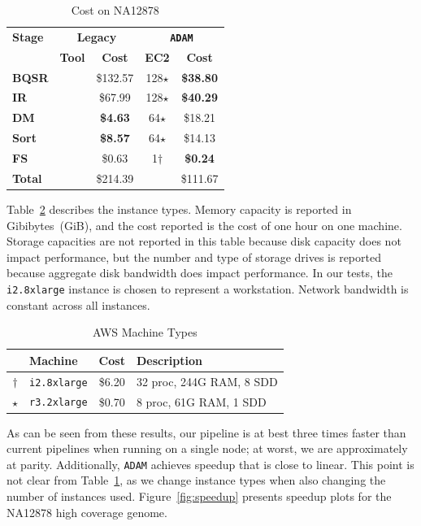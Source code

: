\documentclass{acm_proc_article-sp}
\begin{document}
\begin{table}[h]
\caption{Cost on NA12878}
\label{tab:overview}
\begin{center}
\begin{tabular}{ l | c c | c c }
\hline
\bf Stage & \multicolumn{2}{c}{\bf Legacy} & \multicolumn{2}{c}{\bf \texttt{ADAM}} \\
 & \bf Tool & \bf Cost & \bf EC2 & \bf Cost \\
\hline
\bf BQSR & \cite{depristo11} & \$132.57 & 128$\star$ & \bf \$38.80 \\
\bf IR & \cite{depristo11} & \$67.99 & 128$\star$ & \bf \$40.29 \\
\bf DM & \cite{sambamba} & \bf \$4.63 & 64$\star$ & \$18.21 \\
\bf Sort & \cite{sambamba} & \bf \$8.57 & 64$\star$ & \$14.13 \\
\bf FS & \cite{sambamba} & \$0.63 & 1$\dagger$ & \bf \$0.24 \\
\hline
\bf Total & & \$214.39 & & \$111.67 \\
\end{tabular}
\end{center}
\end{table}

Table~\ref{tab:machines} describes the instance types. Memory capacity is reported in Gibibytes~(GiB),
and the cost reported is the cost of one hour on one machine.
Storage capacities are not reported in this table because disk
capacity does not impact performance, but the number and type of storage drives is reported because
aggregate disk bandwidth does impact performance. In our tests, the \texttt{i2.8xlarge} instance is
chosen to represent a workstation. Network bandwidth is constant across all instances.

\begin{table}[h]
\caption{AWS Machine Types}
\label{tab:machines}
\begin{center}
\begin{tabular}{ c l c l }
\hline
 & \bf Machine & \bf Cost & \bf Description \\
\hline
\hline
$\dagger$ & \texttt{i2.8xlarge} & \$6.20 & 32 proc, 244G RAM, 8 SDD \\
$\star$ & \texttt{r3.2xlarge} & \$0.70 & 8 proc, 61G RAM, 1 SDD \\
\hline
\end{tabular}
\end{center}
\end{table}

As can be seen from these results, our pipeline is at best three times faster than current pipelines when running
on a single node; at worst, we are approximately at parity. Additionally, \texttt{ADAM} achieves speedup that is
close to linear. This point is not clear from Table~\ref{tab:overview}, as we change instance types when also
changing the number of instances used. Figure~\ref{fig:speedup} presents speedup plots for the NA12878 high
coverage genome.
\end{document}
